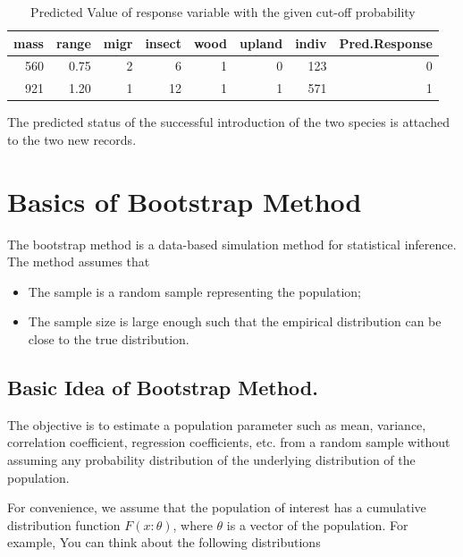 \documentclass[
]{book}
\begin{document}
\begin{table}

\caption{\label{tab:unnamed-chunk-103}Predicted Value of response variable 
      with the given cut-off probability}
\centering
\begin{tabular}[t]{r|r|r|r|r|r|r|r}
\hline
mass & range & migr & insect & wood & upland & indiv & Pred.Response\\
\hline
560 & 0.75 & 2 & 6 & 1 & 0 & 123 & 0\\
\hline
921 & 1.20 & 1 & 12 & 1 & 1 & 571 & 1\\
\hline
\end{tabular}
\end{table}

The predicted status of the successful introduction of the two species is attached to the two new records.

\hfill\break

\hypertarget{basics-of-bootstrap-method}{%
\chapter{Basics of Bootstrap Method}\label{basics-of-bootstrap-method}}

The bootstrap method is a data-based simulation method for statistical inference. The method assumes that

\begin{itemize}
\item
  The sample is a random sample representing the population;
\item
  The sample size is large enough such that the empirical distribution can be close to the true distribution.
\end{itemize}

\hypertarget{basic-idea-of-bootstrap-method.}{%
\section{Basic Idea of Bootstrap Method.}\label{basic-idea-of-bootstrap-method.}}

The objective is to estimate a population parameter such as mean, variance, correlation coefficient, regression coefficients, etc. from a random sample without assuming any probability distribution of the underlying distribution of the population.

For convenience, we assume that the population of interest has a cumulative distribution function \(F(x: \theta)\), where \(\theta\) is a vector of the population. For example, You can think about the following distributions
\end{document}

